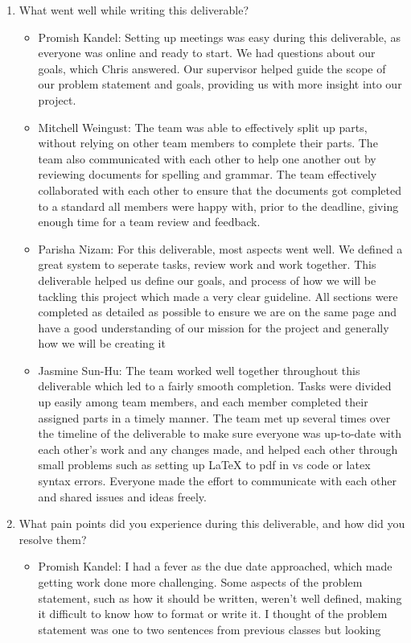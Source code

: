 \documentclass{article}
\begin{document}
\begin{enumerate}
    \item What went well while writing this deliverable? 
    \begin{itemize}
        \item Promish Kandel: Setting up meetings was easy during this deliverable, as everyone was online and ready to start. We had questions about our goals, which Chris answered. Our supervisor helped guide the scope of our problem statement and goals, providing us with more insight into our project.
        \item Mitchell Weingust: The team was able to effectively split up parts, without relying on other team members to complete their parts. The team also communicated with each other to help one another out by reviewing documents for spelling and grammar. The team effectively collaborated with each other to ensure that the documents got completed to a standard all members were happy with, prior to the deadline, giving enough time for a team review and feedback.
        \item Parisha Nizam: For this deliverable, most aspects went well. We defined a great system to seperate tasks, review work and work together. This deliverable helped us define our goals, and process of how we will be tackling this project which made a very clear guideline. All sections were completed as detailed as possible to ensure we are on the same page and have a good understanding of our mission for the project and generally how we will be creating it
        \item Jasmine Sun-Hu: The team worked well together throughout this deliverable which led to a fairly smooth completion. Tasks were divided up easily among team members, and each member completed their assigned parts in a timely manner. The team met up several times over the timeline of the deliverable to make sure everyone was up-to-date with each other's work and any changes made, and helped each other through small problems such as setting up LaTeX to pdf in vs code or latex syntax errors. Everyone made the effort to communicate with each other and shared issues and ideas freely.
    \end{itemize}
    \item What pain points did you experience during this deliverable, and how
    did you resolve them?
    \begin{itemize}
        \item Promish Kandel: I had a fever as the due date approached, which made getting work done more challenging. Some aspects of the problem statement, such as how it should be written, weren't well defined, making it difficult to know how to format or write it. I thought of the problem statement was one to two sentences from previous classes but looking 

\end{itemize}
\end{enumerate}
\end{document}
